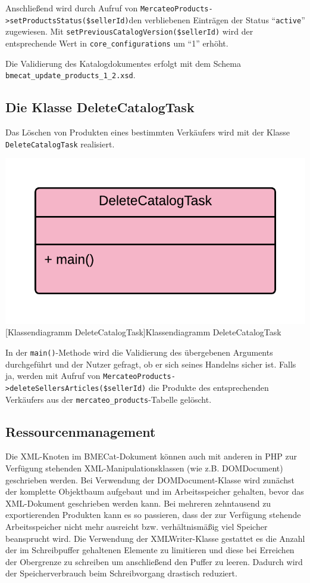 {	Anschließend wird durch Aufruf von \texttt{MercateoProducts->setProductsStatus(\$sellerId)}den verbliebenen Einträgen der Status \enquote{\texttt{active}} zugewiesen. Mit \texttt{setPreviousCatalogVersion(\$seller\-Id)} wird der entsprechende Wert in \texttt{core\_configurations} um \enquote{1} erhöht.
	
	Die Validierung des Katalogdokumentes erfolgt mit dem Schema \texttt{bmecat\_update\_products\_1\_2.xsd}.
	
	\subsection{Die Klasse DeleteCatalogTask}
	
	Das Löschen von Produkten eines bestimmten Verkäufers wird mit der Klasse \texttt{DeleteCatalogTask} realisiert. 
	
	\begin{minipage}{\linewidth}
		\vspace{1em}
		\centering
		\includegraphics[width=0.4 \linewidth]{img/DeleteCatalogTask}
		[Klassendiagramm DeleteCatalogTask]{Klassendiagramm DeleteCatalogTask}
		\vspace{1em}
	\end{minipage}	
	
	In der \texttt{main()}-Methode wird die Validierung des übergebenen Arguments durchgeführt und der Nutzer gefragt, ob er sich seines Handelns sicher ist. Falls ja, werden mit Aufruf von \texttt{MercateoProducts->deleteSellersArticles(\$sellerId)} die Produkte des entsprechenden Verkäufers aus der \texttt{mercateo\_products}-Tabelle gelöscht.
	\clearpage
	\subsection{Ressourcenmanagement}
	
	Die XML-Knoten im BMECat-Dokument können auch mit anderen in PHP zur Verfügung stehenden XML-Manipulationsklassen (wie z.B.  DOMDocument) geschrieben werden. Bei Verwendung der DOMDocument-Klasse wird zunächst der komplette Objektbaum aufgebaut und im Arbeitsspeicher gehalten, bevor das XML-Dokument geschrieben werden kann. Bei mehreren zehntausend zu exportierenden Produkten kann es so passieren, dass der zur Verfügung stehende Arbeitsspeicher nicht mehr ausreicht bzw. verhältnismäßig viel Speicher beansprucht wird. Die Verwendung der XMLWriter-Klasse gestattet es die Anzahl der im Schreibpuffer gehaltenen Elemente zu limitieren und diese bei Erreichen der Obergrenze zu schreiben um anschließend den Puffer zu leeren. Dadurch wird der Speicherverbrauch beim Schreibvorgang drastisch reduziert. 
		
}
